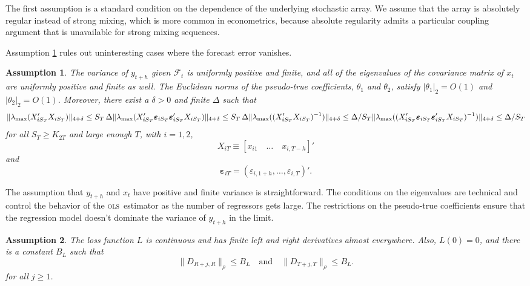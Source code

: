 \documentclass[11pt]{article}
\newtheorem{asmp}{Assumption}
\newcommand{\h}{h}
\newcommand{\ep}[1]{\ensuremath{\boldsymbol{\varepsilon}_{#1}}}
\newcommand{\ols}{\textsc{ols}}
\begin{document}
The first assumption is a standard condition on the dependence of the
underlying stochastic array.  We assume that the array is absolutely
regular instead of strong mixing, which is more common in
econometrics, because absolute regularity admits a particular coupling
argument \citep{berbee_random_1979} that is unavailable for strong
mixing sequences.

Assumption \ref{asmp-2} rules out uninteresting cases where the
forecast error vanishes.
\begin{asmp}\label{asmp-2}
  The variance of $y_{t+\h}$ given $\mathcal{F}_t$ is uniformly
  positive and finite, and all of the eigenvalues of the covariance
  matrix of $x_t$ are uniformly positive and finite as well.  The
  Euclidean norms of the pseudo-true coefficients, $\theta_1$ and
  $\theta_2$, satisfy $|\theta_1|_2 = O(1)$ and $|\theta_2|_2 = O(1)$.
  Moreover, there exist a $\delta > 0$ and finite $\Delta$ such that
  \begin{equation*}
    \lVert \lambda_{\max}(X_{iS_{T}}'X_{iS_{T}}) \rVert_{4+\delta}
    \leq S_{T}\, \Delta \\
    \lVert
    \lambda_{\max}(X_{iS_{T}}'\ep{iS_{T}}\ep{iS_{T}}'X_{iS_{T}})
    \rVert_{4+\delta} \leq S_{T}\, \Delta \\
    \lVert \lambda_{\max}((X_{iS_{T}}'X_{iS_{T}})^{-1}) \rVert_{4+\delta} \leq \Delta/S_{T} \\
    \lVert
    \lambda_{\max}((X_{iS_{T}}'\ep{iS_{T}}\ep{iS_{T}}'X_{iS_{T}})^{-1})\rVert_{4+\delta}
    \leq \Delta/S_{T}
  \end{equation*}
  for all $S_{T} \geq K_{2T}$ and large enough $T$, with $i =
  1,2$,
  \[ X_{iT} \equiv [x_{i1} \quad \dots \quad x_{i,T-\h}]' \]
  and
  \[ \ep{iT} = (\varepsilon_{i,1+\h}, \dots, \varepsilon_{i,T})'.\]
\end{asmp}

The assumption that $y_{t+\h}$ and $x_t$ have positive and finite
variance is straightforward.  The conditions on the eigenvalues are
technical and control the behavior of the \ols\ estimator as the
number of regressors gets large.  The restrictions on the pseudo-true
coefficients ensure that the regression model doesn't dominate the
variance of $y_{t+\h}$ in the limit.  

\begin{asmp}\label{asmp-3}
  The loss function $L$ is continuous and has finite left and right
  derivatives almost everywhere.  Also, $L(0) = 0$, and there is a
  constant $B_L$ such that
  \begin{equation*}
    \|D_{R+j,R}\|_\rho \leq B_L \quad\text{and}\quad
    \|D_{T+j,T}\|_\rho \leq B_L.
  \end{equation*}
  for all $j \geq 1$.
\end{asmp}
\end{document}
